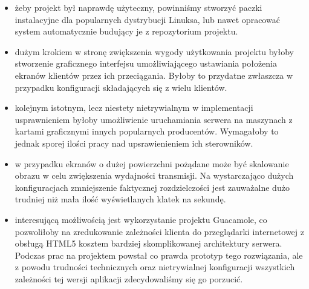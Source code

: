     \begin{itemize}

      \item żeby projekt był naprawdę użyteczny, powinniśmy stworzyć paczki instalacyjne dla popularnych dystrybucji Linuksa, lub nawet opracować system automatycznie budujący je z repozytorium projektu.

      \item dużym krokiem w stronę zwiększenia wygody użytkowania projektu byłoby stworzenie graficznego interfejsu umożliwiającego ustawiania położenia ekranów klientów przez ich przeciągania. Byłoby to przydatne zwłaszcza w przypadku konfiguracji składających się z wielu klientów.

      \item kolejnym istotnym, lecz niestety nietrywialnym w implementacji usprawnieniem byłoby umożliwienie uruchamiania serwera na maszynach z kartami graficznymi innych popularnych producentów. Wymagałoby to jednak sporej ilości pracy nad upsrawienieniem ich sterowników.

      \item w przypadku ekranów o dużej powierzchni pożądane może być skalowanie obrazu w celu zwiększenia wydajności transmisji. Na wystarczająco dużych konfiguracjach zmniejszenie faktycznej rozdzielczości jest zauważalne dużo trudniej niż mała ilość wyświetlanych klatek na sekundę.

      \item interesującą możliwością jest wykorzystanie projektu Guacamole, co pozwoliłoby na zredukowanie zależności klienta do przeglądarki internetowej z obsługą HTML5 kosztem bardziej skomplikowanej architektury serwera. Podczas prac na projektem powstał co prawda prototyp tego rozwiązania, ale z powodu trudności technicznych oraz nietrywialnej konfiguracji wszystkich zależności tej wersji aplikacji zdecydowaliśmy się go porzucić.

    \end{itemize}

    \vfill

